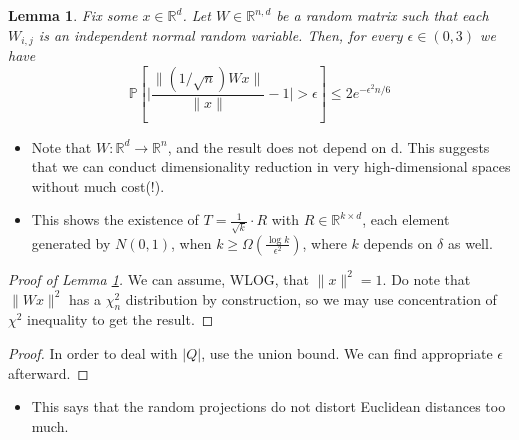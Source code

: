 \documentclass[11pt,reqno]{amsart}
\newtheorem{lemma}[theorem]{Lemma}
\theoremstyle{remark}
\begin{document}
\begin{lemma}\label{lem:concentration}
Fix some $x\in\mathbb{R}^d$. Let $W\in\mathbb{R}^{n,d}$ be a random matrix such that each $W_{i,j}$
 is an independent normal random variable. Then, for every $\epsilon\in (0,3)$ we have
 \begin{equation}
 \mathbb{P}[\lvert \frac{\lVert (1/\sqrt n)Wx\rVert}{\lVert 
    x\rVert}-1 \rvert>\epsilon]\leq 2e^{-\epsilon^2 n/6}
 \end{equation}
\end{lemma}
\begin{itemize}
\item Note that $W:\mathbb{R}^d\to\mathbb{R}^n$, and the result does not depend on d. This suggests
 that we can conduct dimensionality reduction in very high-dimensional spaces without much cost(!).
\item This shows the existence of $T=\frac{1}{\sqrt k}\cdot R$ with
 $R\in \mathbb{R}^{k\times d}$, each element generated by $N(0,1)$, when 
 $k\geq \Omega(\frac {\log{k}}{\epsilon^2})$, where $k$ depends on $\delta$ as well. 
\end{itemize}
\begin{proof}[Proof of Lemma \ref{lem:concentration}]
We can assume, WLOG, that $\lVert x\rVert^2=1$. Do note that $\lVert Wx\rVert^2$ has a $\chi_n^2$ distribution
 by construction, so we may use concentration of $\chi^2$ inequality to get the result.
\end{proof}
\begin{proof}
In order to deal with $\lvert Q\rvert$, use the union bound. We can find appropriate $\epsilon$ afterward.
\end{proof}
\begin{itemize}
\item This says that the random projections do not distort Euclidean distances too much.
\end{itemize}
\end{document}
